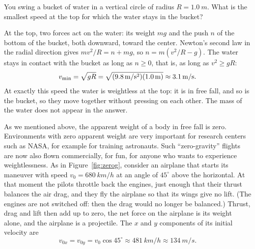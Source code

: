 \documentclass[11pt,a4paper]{article}
\begin{document}
\begin{example}
\setlength{\parskip}{0.5em plus 0.1em}%
You swing a bucket of water in a vertical circle of radius $R = \qty{1.0}{m}$. What is the smallest
speed at the top for which the water stays in the bucket?

At the top, two forces act on the water: its weight $mg$ and the push $n$ of the bottom of the bucket,
both downward, toward the center. Newton's second law in the radial direction gives
$m v^2/R = n + mg$, so $n = m(v^2/R - g)$. The water stays in contact with the bucket as long as
$n \geq 0$, that is, as long as $v^2 \geq gR$:
\[
  v_{\mathrm{min}} = \sqrt{gR} = \sqrt{(\qty{9.8}{m/s^2})(\qty{1.0}{m})} \approx \qty{3.1}{m/s} .
\]
At exactly this speed the water is weightless at the top: it is in free fall, and so is the bucket,
so they move together without pressing on each other. The mass of the water does not appear in the
answer.
\end{example}

As we mentioned above, the apparent weight of a body in free fall is zero. Environments with zero
apparent weight are very important for research centers such as NASA, for example for training
astronauts. Such ``zero-gravity'' flights are now also flown commercially, for fun, for anyone who
wants to experience weightlessness. As in Figure~\ref{fig:zerog}, consider an airplane that starts
its maneuver with speed $v_0 = \qty{680}{km/h}$ at an angle of $45^\circ$ above the horizontal. At
that moment the pilots throttle back the engines, just enough that their thrust balances the air
drag, and they fly the airplane so that its wings give no lift. (The engines are not switched off: then
the drag would no longer be balanced.) Thrust, drag and lift then add up to zero, the net force on the
airplane is its weight alone, and the airplane is a projectile. The $x$ and $y$ components of
its initial velocity are
\begin{equation}\label{eq:zg-v0}
  v_{0x} = v_{0y} = v_0 \cos 45^\circ \approx \qty{481}{km/h} \approx \qty{134}{m/s} .
\end{equation}
\end{document}
